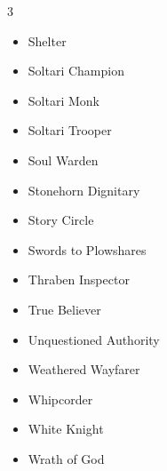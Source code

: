 \documentclass[11pt]{article}
\begin{document}
\begin{multicols}{3}
\begin{itemize}[leftmargin=1em,itemsep=0pt,parsep=0pt]
\item Shelter
\item Soltari Champion
\item Soltari Monk
\item Soltari Trooper
\item Soul Warden
\item Stonehorn Dignitary
\item Story Circle
\item Swords to Plowshares
\item Thraben Inspector
\item True Believer
\item Unquestioned Authority
\item Weathered Wayfarer
\item Whipcorder
\item White Knight
\item Wrath of God
\end{itemize}
\end{multicols}
\end{document}
